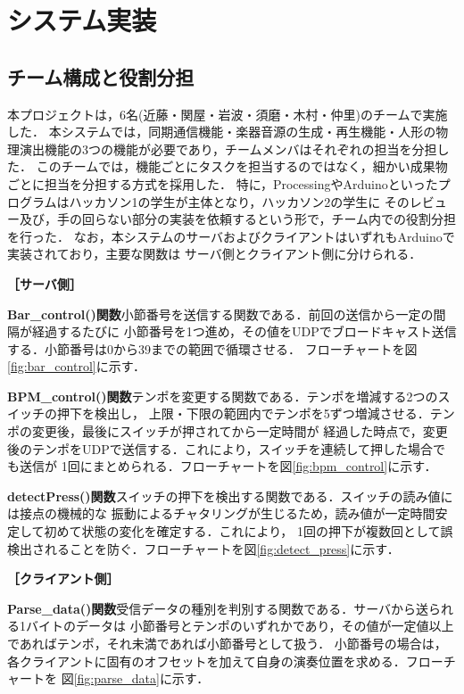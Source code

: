 \section{システム実装}
\subsection{チーム構成と役割分担}
本プロジェクトは，6名(近藤・関屋・岩波・須磨・木村・仲里)のチームで実施した．
本システムでは，同期通信機能・楽器音源の生成・再生機能・人形の物理演出機能の3つの機能が必要であり，チームメンバはそれぞれの担当を分担した．
このチームでは，機能ごとにタスクを担当するのではなく，細かい成果物ごとに担当を分担する方式を採用した．
特に，ProcessingやArduinoといったプログラムはハッカソン1の学生が主体となり，ハッカソン2の学生に
そのレビュー及び，手の回らない部分の実装を依頼するという形で，チーム内での役割分担を行った．
なお，本システムのサーバおよびクライアントはいずれもArduinoで実装されており，主要な関数は
サーバ側とクライアント側に分けられる．

\vspace{1zh}\noindent
\textbf{［サーバ側］}

\textbf{Bar\_control()関数}\quad 小節番号を送信する関数である．前回の送信から一定の間隔が経過するたびに
小節番号を1つ進め，その値をUDPでブロードキャスト送信する．小節番号は0から39までの範囲で循環させる．
フローチャートを図\ref{fig:bar_control}に示す．

\textbf{BPM\_control()関数}\quad テンポを変更する関数である．テンポを増減する2つのスイッチの押下を検出し，
上限・下限の範囲内でテンポを5ずつ増減させる．テンポの変更後，最後にスイッチが押されてから一定時間が
経過した時点で，変更後のテンポをUDPで送信する．これにより，スイッチを連続して押した場合でも送信が
1回にまとめられる．フローチャートを図\ref{fig:bpm_control}に示す．

\textbf{detectPress()関数}\quad スイッチの押下を検出する関数である．スイッチの読み値には接点の機械的な
振動によるチャタリングが生じるため，読み値が一定時間安定して初めて状態の変化を確定する．これにより，
1回の押下が複数回として誤検出されることを防ぐ．フローチャートを図\ref{fig:detect_press}に示す．

\vspace{1zh}\noindent
\textbf{［クライアント側］}

\textbf{Parse\_data()関数}\quad 受信データの種別を判別する関数である．サーバから送られる1バイトのデータは
小節番号とテンポのいずれかであり，その値が一定値以上であればテンポ，それ未満であれば小節番号として扱う．
小節番号の場合は，各クライアントに固有のオフセットを加えて自身の演奏位置を求める．フローチャートを
図\ref{fig:parse_data}に示す．

